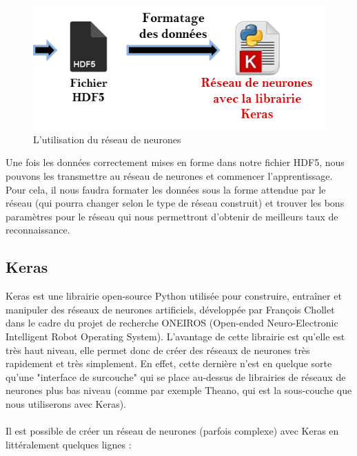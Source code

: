 \documentclass{article}
\begin{document}
\hphantom{.}
\begin{figure}[h]
  \centerline{\includegraphics[scale=0.9]{img/schema_reseau_keras.png}}
  \caption{L'utilisation du réseau de neurones}
\end{figure}

Une fois les données correctement mises en forme dans notre fichier HDF5, nous pouvons les transmettre au réseau de neurones et commencer l'apprentissage. Pour cela, il nous faudra formater les données sous la forme attendue par le réseau (qui pourra changer selon le type de réseau construit) et trouver les bons paramètres pour le réseau qui nous permettront d'obtenir de meilleurs taux de reconnaissance.

\subsection{Keras}

Keras\cite{docKeras} est une librairie open-source Python utilisée pour construire, entraîner et manipuler des réseaux de neurones artificiels, développée par François Chollet dans le cadre du projet de recherche ONEIROS (Open-ended Neuro-Electronic Intelligent Robot Operating System). L'avantage de cette librairie est qu'elle est très haut niveau, elle permet donc de créer des réseaux de neurones très rapidement et très simplement. En effet, cette dernière n'est en quelque sorte qu'une "interface de surcouche" qui se place au-dessus de librairies de réseaux de neurones plus bas niveau (comme par exemple Theano\cite{docTheano}, qui est la sous-couche que nous utiliserons avec Keras).\\
 \\
Il est possible de créer un réseau de neurones (parfois complexe) avec Keras en littéralement quelques lignes :\\

\end{document}
